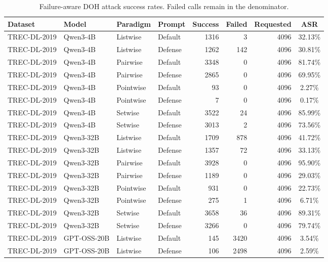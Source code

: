 \begin{table}[t]
\centering
\small
\setlength{\tabcolsep}{4pt}
\caption{Failure-aware DOH attack success rates. Failed calls remain in the denominator.}
\label{tab:attack-failure-aware-doh}
\begin{tabular}{ll l l r r r c}
\toprule
\textbf{Dataset} & \textbf{Model} & \textbf{Paradigm} & \textbf{Prompt} & \textbf{Success} & \textbf{Failed} & \textbf{Requested} & \textbf{ASR} \\
\midrule
TREC-DL-2019 & Qwen3-4B & Listwise & Default & 1316 & 3 & 4096 & 32.13\% \\
TREC-DL-2019 & Qwen3-4B & Listwise & Defense & 1262 & 142 & 4096 & 30.81\% \\
TREC-DL-2019 & Qwen3-4B & Pairwise & Default & 3348 & 0 & 4096 & 81.74\% \\
TREC-DL-2019 & Qwen3-4B & Pairwise & Defense & 2865 & 0 & 4096 & 69.95\% \\
TREC-DL-2019 & Qwen3-4B & Pointwise & Default & 93 & 0 & 4096 & 2.27\% \\
TREC-DL-2019 & Qwen3-4B & Pointwise & Defense & 7 & 0 & 4096 & 0.17\% \\
TREC-DL-2019 & Qwen3-4B & Setwise & Default & 3522 & 24 & 4096 & 85.99\% \\
TREC-DL-2019 & Qwen3-4B & Setwise & Defense & 3013 & 2 & 4096 & 73.56\% \\
TREC-DL-2019 & Qwen3-32B & Listwise & Default & 1709 & 878 & 4096 & 41.72\% \\
TREC-DL-2019 & Qwen3-32B & Listwise & Defense & 1357 & 72 & 4096 & 33.13\% \\
TREC-DL-2019 & Qwen3-32B & Pairwise & Default & 3928 & 0 & 4096 & 95.90\% \\
TREC-DL-2019 & Qwen3-32B & Pairwise & Defense & 1189 & 0 & 4096 & 29.03\% \\
TREC-DL-2019 & Qwen3-32B & Pointwise & Default & 931 & 0 & 4096 & 22.73\% \\
TREC-DL-2019 & Qwen3-32B & Pointwise & Defense & 275 & 1 & 4096 & 6.71\% \\
TREC-DL-2019 & Qwen3-32B & Setwise & Default & 3658 & 36 & 4096 & 89.31\% \\
TREC-DL-2019 & Qwen3-32B & Setwise & Defense & 3266 & 0 & 4096 & 79.74\% \\
TREC-DL-2019 & GPT-OSS-20B & Listwise & Default & 145 & 3420 & 4096 & 3.54\% \\
TREC-DL-2019 & GPT-OSS-20B & Listwise & Defense & 106 & 2498 & 4096 & 2.59\% \\

\end{tabular}
\end{table}
